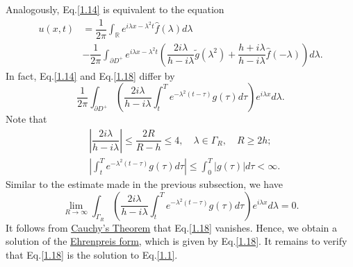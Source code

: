 \documentclass[12pt]{article}
\numberwithin{equation}{section}
\begin{document}
Analogously, Eq.\eqref{1.14} is equivalent to the equation
\begin{equation}\label{1.18}
    \begin{split}
        u(x,t)&=\dfrac{1}{2\pi}\int_{\mathbb{R}}e^{i\lambda x-\lambda^2 t}\hat{f}(\lambda)d\lambda\\
        &-\dfrac{1}{2\pi} \int_{\partial D^+} e^{i\lambda x-\lambda^2 t}\left(\dfrac{2i\lambda}{h-i\lambda}\tilde{g}(\lambda^2)+\dfrac{h+i\lambda}{h-i\lambda}\hat{f}(-\lambda)\right) d\lambda.
    \end{split}
\end{equation}
In fact, Eq.\eqref{1.14} and Eq.\eqref{1.18} differ by
\begin{equation}\label{1.19}
    \dfrac{1}{2\pi}\int_{\partial D^+} \left( \dfrac{2i\lambda}{h-i\lambda}\int_{t}^{T} e^{-\lambda^2(t-\tau)}g(\tau)d\tau \right)e^{i\lambda x}d\lambda.
\end{equation}
Note that \begin{equation*}
    \begin{split}
    &\left|\dfrac{2i\lambda}{h-i\lambda}\right|\leqslant \dfrac{2R}{R-h}\leqslant 4,\quad\lambda\in\Gamma_{R},\quad R\geqslant 2h;\\
    &\left|\int_{t}^{T} e^{-\lambda^2(t-\tau)}g(\tau)d\tau\right|\leqslant \int_{0}^{T} \vert g(\tau)\vert d\tau<\infty.
    \end{split}
\end{equation*}
Similar to the estimate made in the previous subsection, we have
\begin{equation*}
    \lim\limits_{R\to \infty}\int_{\Gamma_R} \left( \dfrac{2i\lambda}{h-i\lambda}\int_{t}^{T} e^{-\lambda^2(t-\tau)}g(\tau)d\tau \right)e^{i\lambda x}d\lambda=0.
\end{equation*}
It follows from \href{https://w.wiki/9aTM}{Cauchy's Theorem} that Eq.\eqref{1.18} vanishes. Hence, we obtain a solution of the \href{https://w.wiki/9aTe}{Ehrenpreis form}, which is given by Eq.\eqref{1.18}.
It remains to verify that Eq.\eqref{1.18} is the solution to Eq.\eqref{1.1}.
\end{document}
